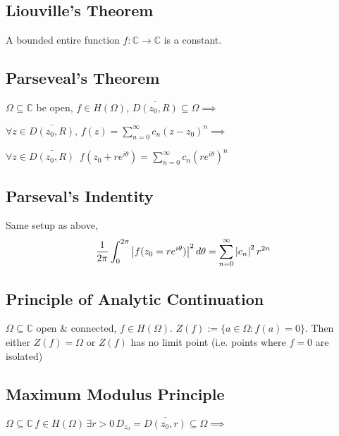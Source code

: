 \subsection{Liouville's Theorem} %
\label{sub:liouville_s_theorem}
A bounded entire function $f : \mathbb{C} \to \mathbb{C}$ is a constant.

\subsection{Parseveal's Theorem} %
\label{sub:parseveal_s_theorem}
$\Omega \subseteq \mathbb{C}$ be open, $f \in H(\Omega)$, $\bar{D(z_0, R)} \subseteq \Omega \implies$

$\forall z \in \bar{D(z_0, R)}, \, f(z) = \sum_{n=0}^{\infty} c_n (z - z_0)^n \implies$

$\forall z \in \bar{D(z_0, R)} \enspace f(z_0 + re^{i \theta}) = \sum_{n=0}^{\infty} c_n (re^{i \theta})^n$

\subsection{Parseval's Indentity} %
\label{sub:parseval_s_indentity}
Same setup as above,
\begin{equation*}
	\frac{1}{2 \pi} \int_{0}^{2 \pi} \left|f(z_0 = re^{i \theta})\right|^2 \mathop{}\!d{\theta} = \sum_{n=0}^{\infty} \left|c_n\right|^2 r^{2n}
\end{equation*}

\subsection{Principle of Analytic Continuation} %
\label{sub:principle_of_analytic_continuation}
$\Omega \subseteq \mathbb{C}$ open \& connected, $f \in H(\Omega)$. $Z(f) := \{a \in \Omega : f(a) = 0 \}$. Then either $Z(f) = \Omega$ or $Z(f)$ has no limit point (i.e. points where $f = 0$ are isolated)

\subsection{Maximum Modulus Principle} %
\label{sub:maximum_modulus_principle}

$\Omega \subseteq \mathbb{C} \, f \in H(\Omega) \, \exists r > 0 \, D_{z_0} = \bar{D(z_0, r)} \subseteq \Omega \implies$

